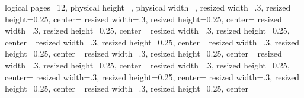 \pgfpagesphysicalpageoptions%
{
logical pages=12,
physical height=\paperwidth,
physical width=\paperheight,
}
{
resized width=.3\pgfphysicalwidth,
resized height=0.25\pgfphysicalheight,
center=\pgfpoint{0.2\pgfphysicalwidth}{0.9\pgfphysicalheight}
}
{
resized width=.3\pgfphysicalwidth,
resized height=0.25\pgfphysicalheight,
center=\pgfpoint{.6\pgfphysicalwidth}{.9\pgfphysicalheight}
}
{
resized width=.3\pgfphysicalwidth,
resized height=0.25\pgfphysicalheight,
center=\pgfpoint{\pgfphysicalwidth}{.9\pgfphysicalheight}
}
{
resized width=.3\pgfphysicalwidth,
resized height=0.25\pgfphysicalheight,
center=\pgfpoint{.2\pgfphysicalwidth}{.71\pgfphysicalheight}
}
{
resized width=.3\pgfphysicalwidth,
resized height=0.25\pgfphysicalheight,
center=\pgfpoint{.6\pgfphysicalwidth}{.71\pgfphysicalheight}
}
{
resized width=.3\pgfphysicalwidth,
resized height=0.25\pgfphysicalheight,
center=\pgfpoint{\pgfphysicalwidth}{.71\pgfphysicalheight}
}
{
resized width=.3\pgfphysicalwidth,
resized height=0.25\pgfphysicalheight,
center=\pgfpoint{.2\pgfphysicalwidth}{.52\pgfphysicalheight}
}
{
resized width=.3\pgfphysicalwidth,
resized height=0.25\pgfphysicalheight,
center=\pgfpoint{.6\pgfphysicalwidth}{.52\pgfphysicalheight}
}
{
resized width=.3\pgfphysicalwidth,
resized height=0.25\pgfphysicalheight,
center=\pgfpoint{\pgfphysicalwidth}{.52\pgfphysicalheight}
}
{
resized width=.3\pgfphysicalwidth,
resized height=0.25\pgfphysicalheight,
center=\pgfpoint{.2\pgfphysicalwidth}{.33\pgfphysicalheight}
}
{
resized width=.3\pgfphysicalwidth,
resized height=0.25\pgfphysicalheight,
center=\pgfpoint{.6\pgfphysicalwidth}{.33\pgfphysicalheight}
}
{
resized width=.3\pgfphysicalwidth,
resized height=0.25\pgfphysicalheight,
center=\pgfpoint{\pgfphysicalwidth}{.33\pgfphysicalheight}
}

